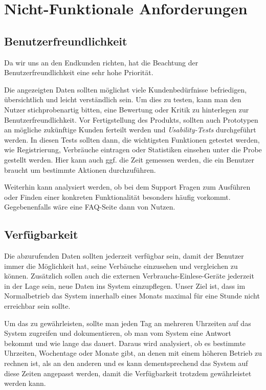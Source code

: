 \section{Nicht-Funktionale Anforderungen}

\subsection{Benutzerfreundlichkeit}
Da wir uns an den Endkunden richten, hat die Beachtung der Benutzerfreundlichkeit eine sehr hohe Priorität.

Die angezeigten Daten sollten möglichst viele Kundenbedürfnisse
befriedigen, übersichtlich und leicht verständlich sein.
Um dies zu testen, kann man den Nutzer stichprobenartig bitten, eine Bewertung oder Kritik zu hinterlegen zur Benutzerfreundlichkeit.
Vor Fertigstellung des Produkts, sollten auch Prototypen an mögliche zukünftige Kunden ferteilt werden und \textit{Usability-Tests} durchgeführt werden. In diesen Tests sollten dann, die wichtigsten Funktionen getestet werden, wie Registrierung, Verbräuche eintragen oder Statistiken einsehen unter die Probe gestellt werden.
Hier kann auch ggf. die Zeit gemessen werden, die ein Benutzer braucht um bestimmte Aktionen durchzuführen.

Weiterhin kann analysiert werden, ob bei dem Support Fragen zum Ausführen oder Finden einer konkreten Funktionalität besonders häufig vorkommt. Gegebenenfalls wäre eine FAQ-Seite dann von Nutzen.

\subsection{Verfügbarkeit}
Die abzurufenden Daten sollten jederzeit verfügbar sein,
damit der Benutzer immer die Möglichkeit hat,
seine Verbäuche einzusehen und vergleichen zu können. Zusätzlich sollen auch die externen Verbrauchs-Einlese-Geräte jederzeit in der Lage sein, neue Daten ins System einzupflegen.
Unser Ziel ist, dass im Normalbetrieb das System innerhalb eines Monats maximal für eine Stunde nicht erreichbar sein sollte.

Um das zu gewährleisten, sollte man jeden Tag an mehreren Uhrzeiten auf das System zugreifen
und dokumentieren, ob man vom System eine Antwort bekommt und wie lange das dauert.
Daraus wird analysiert, ob es bestimmte Uhrzeiten, Wochentage oder Monate gibt,
an denen mit einem höheren Betrieb zu rechnen ist, als an den anderen und es kann dementsprechend das
System auf diese Zeiten angepasst werden, damit die Verfügbarkeit trotzdem gewährleistet werden kann.


